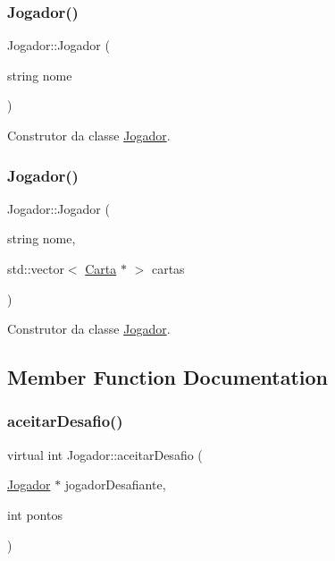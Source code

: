 \subsubsection{\texorpdfstring{Jogador()}{Jogador()}\hspace{0.1cm}{\footnotesize\ttfamily [1/2]}}
{\footnotesize\ttfamily Jogador\+::\+Jogador (\begin{DoxyParamCaption}\item[{string}]{nome }\end{DoxyParamCaption})}



Construtor da classe \mbox{\hyperlink{class_jogador}{Jogador}}. 

\mbox{\label{class_jogador_a2c4a7000bda1bf0390b3b00c1066a71f}} 
\subsubsection{\texorpdfstring{Jogador()}{Jogador()}\hspace{0.1cm}{\footnotesize\ttfamily [2/2]}}
{\footnotesize\ttfamily Jogador\+::\+Jogador (\begin{DoxyParamCaption}\item[{string}]{nome,  }\item[{std\+::vector$<$ \mbox{\hyperlink{class_carta}{Carta}} $\ast$ $>$}]{cartas }\end{DoxyParamCaption})}



Construtor da classe \mbox{\hyperlink{class_jogador}{Jogador}}. 



\subsection{Member Function Documentation}
\mbox{\label{class_jogador_a4eceb45cff559f97cd441da30d36769c}} 
\subsubsection{\texorpdfstring{aceitarDesafio()}{aceitarDesafio()}}
{\footnotesize\ttfamily virtual int Jogador\+::aceitar\+Desafio (\begin{DoxyParamCaption}\item[{\mbox{\hyperlink{class_jogador}{Jogador}} $\ast$}]{jogador\+Desafiante,  }\item[{int}]{pontos }\end{DoxyParamCaption})\hspace{0.3cm}{\ttfamily [pure virtual]}}



